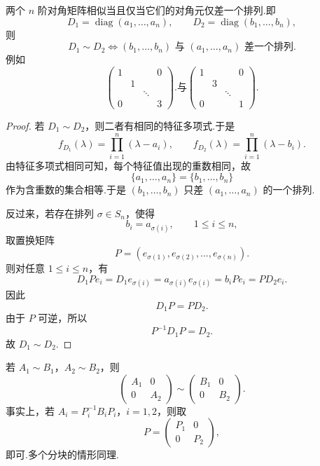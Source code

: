 \begin{example}
	两个 $n$ 阶对角矩阵相似当且仅当它们的对角元仅差一个排列.即
	\[
	D_1=\operatorname{diag}(a_1,\ldots,a_n),\qquad
	D_2=\operatorname{diag}(b_1,\ldots,b_n),
	\]
	则
	\[
	D_1\sim D_2
	\iff
	(b_1,\ldots,b_n) \text{ 与 } (a_1,\ldots,a_n) \text{ 差一个排列}.
	\]	例如
	\[
	\begin{pmatrix}
		1&&&0\\
		&1&&\\
		&&\ddots&\\
		0&&&3
	\end{pmatrix}.
	\text{与}
	\begin{pmatrix}
		1&&&0\\
		&3&&\\
		&&\ddots&\\
		0&&&1
	\end{pmatrix}.
	\]
\end{example}

\begin{proof}
	若 $D_1\sim D_2$，则二者有相同的特征多项式.于是
	\[
	f_{D_1}(\lambda)=\prod_{i=1}^n(\lambda-a_i),
	\qquad
	f_{D_2}(\lambda)=\prod_{i=1}^n(\lambda-b_i).
	\]
	由特征多项式相同可知，每个特征值出现的重数相同，故
	\[
	\{a_1,\ldots,a_n\}=\{b_1,\ldots,b_n\}
	\]
	作为含重数的集合相等.于是 $(b_1,\ldots,b_n)$ 只差 $(a_1,\ldots,a_n)$ 的一个排列.
	
	反过来，若存在排列 $\sigma\in S_n$，使得
	\[
	b_i=a_{\sigma(i)},\qquad 1\leq i\leq n,
	\]
	取置换矩阵
	\[
	P=(e_{\sigma(1)},e_{\sigma(2)},\ldots,e_{\sigma(n)}).
	\]
	则对任意 $1\leq i\leq n$，有
	\[
	D_1Pe_i=	D_1e_{\sigma(i)}
	=
	a_{\sigma(i)}e_{\sigma(i)}
	=
	b_iPe_i
	=
	PD_2e_i.
	\]
	因此
	\[
	D_1P=PD_2.
	\]
	由于 $P$ 可逆，所以
	\[
	P^{-1}D_1P=D_2.
	\]
	故 $D_1\sim D_2$.
\end{proof}
\begin{example}
	若 $A_1\sim B_1$，$A_2\sim B_2$，则
	\[
	\begin{pmatrix}
		A_1&0\\0&A_2
	\end{pmatrix}
	\sim
	\begin{pmatrix}
		B_1&0\\0&B_2
	\end{pmatrix}.
	\]
	事实上，若 $A_i=P_i^{-1}B_iP_i$，$i=1,2$，则取
	\[
	P=\begin{pmatrix}
		P_1&0\\0&P_2
	\end{pmatrix},
	\]
	即可.多个分块的情形同理.
\end{example}

